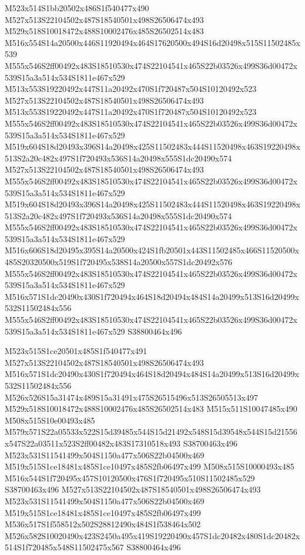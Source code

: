 \documentclass{article}
\begin{document}
\begin{multicols}{2}
M523x514S1bb20502x486S1f540477x490 M527x513S22104502x487S18540501x498S26506474x493 M529x518S10018472x488S10002476x485S26502514x483 M516x554S14a20500x446S11920494x464S17620500x494S16d20498x515S11502485x539 M555x546S2ff00492x483S18510530x474S22104541x465S22b03526x499S36d00472x539S15a3a514x534S1811e467x529 M513x553S19220492x447S11a20492x470S1f720487x504S10120492x523 M527x513S22104502x487S18540501x498S26506474x493 M513x553S19220492x447S11a20492x470S1f720487x504S10120492x523 M555x546S2ff00492x483S18510530x474S22104541x465S22b03526x499S36d00472x539S15a3a514x534S1811e467x529 M519x604S18d20493x396S14a20498x425S11502483x444S11520498x463S19220498x513S2a20c482x497S1f720493x536S14a20498x555S1dc20490x574 M527x513S22104502x487S18540501x498S26506474x493 M555x546S2ff00492x483S18510530x474S22104541x465S22b03526x499S36d00472x539S15a3a514x534S1811e467x529 M519x604S18d20493x396S14a20498x425S11502483x444S11520498x463S19220498x513S2a20c482x497S1f720493x536S14a20498x555S1dc20490x574 M555x546S2ff00492x483S18510530x474S22104541x465S22b03526x499S36d00472x539S15a3a514x534S1811e467x529 M516x606S18d20495x395S14a20500x424S1fb20501x443S11502485x466S11520500x485S20320500x519S1f720495x538S14a20500x557S1dc20492x576 M555x546S2ff00492x483S18510530x474S22104541x465S22b03526x499S36d00472x539S15a3a514x534S1811e467x529 M516x571S1dc20490x430S1f720494x464S18d20494x484S14a20499x513S16d20499x532S11502484x556 M555x546S2ff00492x483S18510530x474S22104541x465S22b03526x499S36d00472x539S15a3a514x534S1811e467x529 S38800464x496

M523x515S1ce20501x485S1f540477x491 M527x513S22104502x487S18540501x498S26506474x493 M516x571S1dc20490x430S1f720494x464S18d20494x484S14a20499x513S16d20499x532S11502484x556 M526x526S15a31474x489S15a31491x475S26515496x513S26505513x497 M529x518S10018472x488S10002476x485S26502514x483 M515x511S10047485x490 M508x515S10e00493x485 M579x571S22a05533x522S15d39485x544S15d21492x548S15d39548x544S15d21556x547S22a03511x523S2ff00482x483S17310518x493 S38700463x496 M523x531S11541499x504S1150a477x506S22b04500x469 M519x515S1ce18481x485S1ce10497x485S2fb06497x499 M508x515S10000493x485 M516x544S1f720495x457S10120500x476S1f720495x510S11502485x529 S38700463x496 M527x513S22104502x487S18540501x498S26506474x493 M523x531S11541499x504S1150a477x506S22b04500x469 M519x515S1ce18481x485S1ce10497x485S2fb06497x499 M536x517S1f558512x502S28812490x484S1f538464x502 M526x582S10020490x423S2450a495x419S19220490x457S1dc20482x480S1dc20482x514S1f720485x548S11502475x567 S38800464x496


\end{multicols}
\end{document}

